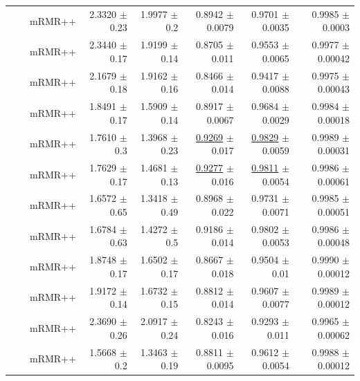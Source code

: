\begin{longtable}{llp{}rrrrr}
 &  & mRMR++ & 2.3320 {\scriptsize $\pm$ 0.23} & 1.9977 {\scriptsize $\pm$ 0.2} & 0.8942 {\scriptsize $\pm$ 0.0079} & 0.9701 {\scriptsize $\pm$ 0.0035} & 0.9985 {\scriptsize $\pm$ 0.0003} \\
 &  & mRMR++ & 2.3440 {\scriptsize $\pm$ 0.17} & 1.9199 {\scriptsize $\pm$ 0.14} & 0.8705 {\scriptsize $\pm$ 0.011} & 0.9553 {\scriptsize $\pm$ 0.0065} & 0.9977 {\scriptsize $\pm$ 0.00042} \\
 &  & mRMR++ & 2.1679 {\scriptsize $\pm$ 0.18} & 1.9162 {\scriptsize $\pm$ 0.16} & 0.8466 {\scriptsize $\pm$ 0.014} & 0.9417 {\scriptsize $\pm$ 0.0088} & 0.9975 {\scriptsize $\pm$ 0.00043} \\
 &  & mRMR++ & 1.8491 {\scriptsize $\pm$ 0.17} & 1.5909 {\scriptsize $\pm$ 0.14} & 0.8917 {\scriptsize $\pm$ 0.0067} & 0.9684 {\scriptsize $\pm$ 0.0029} & 0.9984 {\scriptsize $\pm$ 0.00018} \\
 &  & mRMR++ & 1.7610 {\scriptsize $\pm$ 0.3} & 1.3968 {\scriptsize $\pm$ 0.23} & \underline{0.9269} {\scriptsize $\pm$ 0.017} & \underline{0.9829} {\scriptsize $\pm$ 0.0059} & 0.9989 {\scriptsize $\pm$ 0.00031} \\
 &  & mRMR++ & 1.7629 {\scriptsize $\pm$ 0.17} & 1.4681 {\scriptsize $\pm$ 0.13} & \underline{0.9277} {\scriptsize $\pm$ 0.016} & \underline{0.9811} {\scriptsize $\pm$ 0.0054} & 0.9986 {\scriptsize $\pm$ 0.00061} \\
 &  & mRMR++ & 1.6572 {\scriptsize $\pm$ 0.65} & 1.3418 {\scriptsize $\pm$ 0.49} & 0.8968 {\scriptsize $\pm$ 0.022} & 0.9731 {\scriptsize $\pm$ 0.0071} & 0.9985 {\scriptsize $\pm$ 0.00051} \\
 &  & mRMR++ & 1.6784 {\scriptsize $\pm$ 0.63} & 1.4272 {\scriptsize $\pm$ 0.5} & 0.9186 {\scriptsize $\pm$ 0.014} & 0.9802 {\scriptsize $\pm$ 0.0053} & 0.9986 {\scriptsize $\pm$ 0.00048} \\
 &  & mRMR++ & 1.8748 {\scriptsize $\pm$ 0.17} & 1.6502 {\scriptsize $\pm$ 0.17} & 0.8667 {\scriptsize $\pm$ 0.018} & 0.9504 {\scriptsize $\pm$ 0.01} & 0.9990 {\scriptsize $\pm$ 0.00012} \\
 &  & mRMR++ & 1.9172 {\scriptsize $\pm$ 0.14} & 1.6732 {\scriptsize $\pm$ 0.15} & 0.8812 {\scriptsize $\pm$ 0.014} & 0.9607 {\scriptsize $\pm$ 0.0077} & 0.9989 {\scriptsize $\pm$ 0.00012} \\
 &  & mRMR++ & 2.3690 {\scriptsize $\pm$ 0.26} & 2.0917 {\scriptsize $\pm$ 0.24} & 0.8243 {\scriptsize $\pm$ 0.016} & 0.9293 {\scriptsize $\pm$ 0.011} & 0.9965 {\scriptsize $\pm$ 0.00062} \\
 &  & mRMR++ & 1.5668 {\scriptsize $\pm$ 0.2} & 1.3463 {\scriptsize $\pm$ 0.19} & 0.8811 {\scriptsize $\pm$ 0.0095} & 0.9612 {\scriptsize $\pm$ 0.0054} & 0.9988 {\scriptsize $\pm$ 0.00012} \\

\end{longtable}
